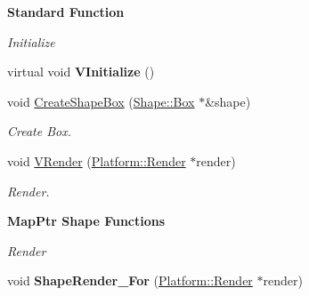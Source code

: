 \begin{Indent}{\bf Standard Function}\par
{\em \label{_amgrpf7f0338d3a18bfce335da7e701143e45}
 Initialize }\begin{DoxyCompactItemize}
\item 
\hypertarget{classContent_1_1Actor_1_1RigidActor_afe846e75b55589c3d186b0e5e5348bc2}{
virtual void {\bfseries VInitialize} ()}
\label{classContent_1_1Actor_1_1RigidActor_afe846e75b55589c3d186b0e5e5348bc2}

\item 
\hypertarget{classContent_1_1Actor_1_1RigidActor_a3dbb2fb0ce451199a6e9e8a99a0f619f}{
void \hyperlink{classContent_1_1Actor_1_1RigidActor_a3dbb2fb0ce451199a6e9e8a99a0f619f}{CreateShapeBox} (\hyperlink{classContent_1_1Shape_1_1Box}{Shape::Box} $\ast$\&shape)}
\label{classContent_1_1Actor_1_1RigidActor_a3dbb2fb0ce451199a6e9e8a99a0f619f}

\begin{DoxyCompactList}\small\item\em Create Box. \item\end{DoxyCompactList}\item 
\hypertarget{classContent_1_1Actor_1_1RigidActor_a862aa5a399c6e1e0f2c3635b34adbd64}{
void \hyperlink{classContent_1_1Actor_1_1RigidActor_a862aa5a399c6e1e0f2c3635b34adbd64}{VRender} (\hyperlink{classPlatform_1_1Render}{Platform::Render} $\ast$render)}
\label{classContent_1_1Actor_1_1RigidActor_a862aa5a399c6e1e0f2c3635b34adbd64}

\begin{DoxyCompactList}\small\item\em Render. \item\end{DoxyCompactList}\end{DoxyCompactItemize}
\end{Indent}
\begin{Indent}{\bf MapPtr Shape Functions}\par
{\em \label{_amgrp31573fabab97c56c2497a44949542e22}
 Render }\begin{DoxyCompactItemize}
\item 
\hypertarget{classContent_1_1Actor_1_1RigidActor_a3c33ae4028b86b0e11b31a78f2d80b5c}{
void {\bfseries ShapeRender\_\-For} (\hyperlink{classPlatform_1_1Render}{Platform::Render} $\ast$render)}
\label{classContent_1_1Actor_1_1RigidActor_a3c33ae4028b86b0e11b31a78f2d80b5c}

\end{DoxyCompactItemize}
\end{Indent}
